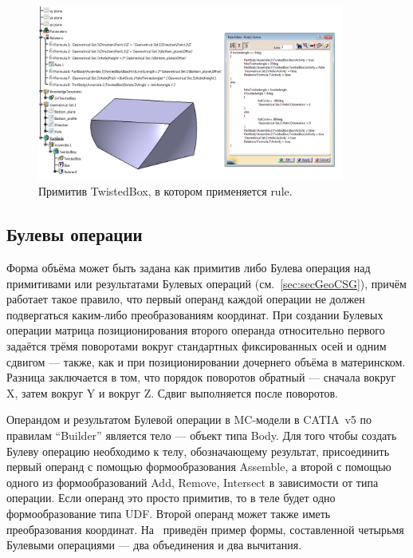 \begin{figure}[H]
\centering
\includegraphics[width=0.9\textwidth]{pictures/Twisted_UDF.png}
\caption{Примитив TwistedBox, в котором применяется rule.}
\label{fig:TwistedUDF}
\end{figure}

\bigskip

%                                       

\subsection{Булевы операции}\label{sec:Boolean}

Форма объёма может быть задана как примитив либо Булева операция над примитивами или результатами Булевых операций (см.~\ref{sec:secGeoCSG}), причём работает такое правило, что первый операнд каждой операции не должен подвергаться каким-либо преобразованиям координат. При создании Булевых операции матрица позиционирования второго операнда относительно первого задаётся трёмя поворотами вокруг стандартных фиксированных осей и одним сдвигом --- также, как и при позиционировании дочернего объёма в материнском. Разница заключается в том, что порядок поворотов обратный --- сначала вокруг X, затем вокруг Y и вокруг Z. Сдвиг выполняется после поворотов.

Операндом и результатом Булевой операции в MC-модели в CATIA~v5 по правилам ``Builder'' является тело --- объект типа Body. Для того чтобы создать Булеву операцию необходимо к телу, обозначающему результат, присоединить первый операнд с помощью формообразования Assemble, а второй с помощью одного из формообразований Add, Remove, Intersect в зависимости от типа операции. Если операнд это просто примитив, то в теле будет одно формообразование типа UDF. Второй операнд может также иметь преобразования координат. На~ приведён пример формы, составленной четырьмя Булевыми операциями --- два объединения и два вычитания.

